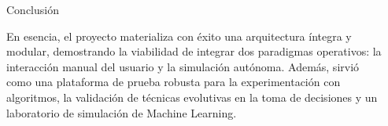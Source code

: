 \documentclass[final]{beamer}
\newlength{\sepwidth}
\newlength{\colwidth}
\newcommand{\separatorcolumn}{\begin{column}{\sepwidth}\end{column}}
\begin{document}
\begin{frame}[t]
\begin{columns}[t]
\begin{column}{\colwidth}
  \begin{block}{Conclusión}

    En esencia, el proyecto materializa con éxito una arquitectura íntegra y modular, demostrando la viabilidad de integrar dos paradigmas operativos: la interacción manual del usuario y la simulación autónoma. Además, sirvió como una plataforma de prueba robusta para la experimentación con algoritmos, la validación de técnicas evolutivas en la toma de decisiones y un laboratorio de simulación de Machine Learning.

  \end{block}

\end{column}


\separatorcolumn

\end{columns}
\end{frame}
\end{document}
